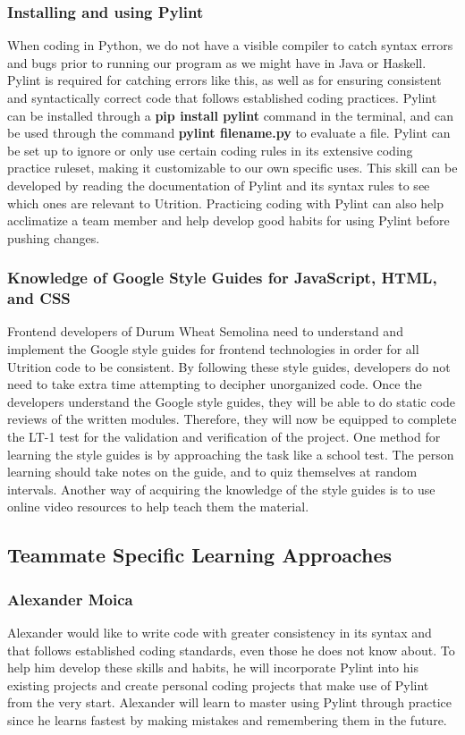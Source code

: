 \documentclass[12pt, titlepage]{article}
\begin{document}
	\subsubsection*{Installing and using Pylint}
	When coding in Python, we do not have a visible compiler to catch syntax errors and bugs prior to running our program as we might have in Java or Haskell. Pylint is required for catching errors like this, as well as for ensuring consistent and syntactically correct code that follows established coding practices. Pylint can be installed through a \textbf{pip install pylint} command in the terminal, and can be used through the command \textbf{pylint filename.py} to evaluate a file. Pylint can be set up to ignore or only use certain coding rules in its extensive coding practice ruleset, making it customizable to our own specific uses. This skill can be developed by reading the documentation of Pylint and its syntax rules to see which ones are relevant to Utrition. Practicing coding with Pylint can also help acclimatize a team member and help develop good habits for using Pylint before pushing changes.
	
	\subsubsection*{Knowledge of Google Style Guides for JavaScript, HTML, and CSS}
	Frontend developers of Durum Wheat Semolina need to understand and implement the Google style guides for frontend technologies in order for all Utrition code to be consistent. By following these style guides, developers do not need to take extra time attempting to decipher unorganized code. Once the developers understand the Google style guides, they will be able to do static code reviews of the written modules. Therefore, they will now be equipped to complete the LT-1 test for the validation and verification of the project. One method for learning the style guides is by approaching the task like a school test. The person learning should take notes on the guide, and to quiz themselves at random intervals. Another way of acquiring the knowledge of the style guides is to use online video resources to help teach them the material.
	
	\subsection*{Teammate Specific Learning Approaches}
	\subsubsection*{Alexander Moica}
	Alexander would like to write code with greater consistency in its syntax and that follows established coding standards, even those he does not know about. To help him develop these skills and habits, he will incorporate Pylint into his existing projects and create personal coding projects that make use of Pylint from the very start. Alexander will learn to master using Pylint through practice since he learns fastest by making mistakes and remembering them in the future.
	
\end{document}
